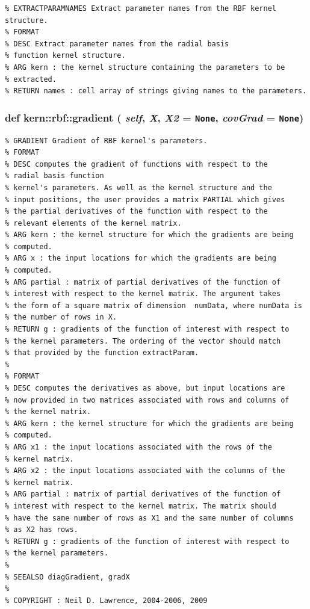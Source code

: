 \footnotesize\begin{verbatim}% EXTRACTPARAMNAMES Extract parameter names from the RBF kernel structure.
% FORMAT
% DESC Extract parameter names from the radial basis
% function kernel structure.
% ARG kern : the kernel structure containing the parameters to be
% extracted.
% RETURN names : cell array of strings giving names to the parameters.

\end{verbatim}
\normalsize
 \hypertarget{classkern_1_1rbf_baceff6cd7ac7bdc69d5797dff72c5d2}{
\subsubsection[{gradient}]{\setlength{\rightskip}{0pt plus 5cm}def kern::rbf::gradient ( {\em self}, \/   {\em X}, \/   {\em X2} = {\tt None}, \/   {\em covGrad} = {\tt None})}}
\label{classkern_1_1rbf_baceff6cd7ac7bdc69d5797dff72c5d2}




\footnotesize\begin{verbatim}% GRADIENT Gradient of RBF kernel's parameters.
% FORMAT
% DESC computes the gradient of functions with respect to the
% radial basis function
% kernel's parameters. As well as the kernel structure and the
% input positions, the user provides a matrix PARTIAL which gives
% the partial derivatives of the function with respect to the
% relevant elements of the kernel matrix. 
% ARG kern : the kernel structure for which the gradients are being
% computed.
% ARG x : the input locations for which the gradients are being
% computed. 
% ARG partial : matrix of partial derivatives of the function of
% interest with respect to the kernel matrix. The argument takes
% the form of a square matrix of dimension  numData, where numData is
% the number of rows in X.
% RETURN g : gradients of the function of interest with respect to
% the kernel parameters. The ordering of the vector should match
% that provided by the function extractParam.
%
% FORMAT
% DESC computes the derivatives as above, but input locations are
% now provided in two matrices associated with rows and columns of
% the kernel matrix. 
% ARG kern : the kernel structure for which the gradients are being
% computed.
% ARG x1 : the input locations associated with the rows of the
% kernel matrix.
% ARG x2 : the input locations associated with the columns of the
% kernel matrix.
% ARG partial : matrix of partial derivatives of the function of
% interest with respect to the kernel matrix. The matrix should
% have the same number of rows as X1 and the same number of columns
% as X2 has rows.
% RETURN g : gradients of the function of interest with respect to
% the kernel parameters.
%
% SEEALSO diagGradient, gradX
%
% COPYRIGHT : Neil D. Lawrence, 2004-2006, 2009

\end{verbatim}
\normalsize
 

